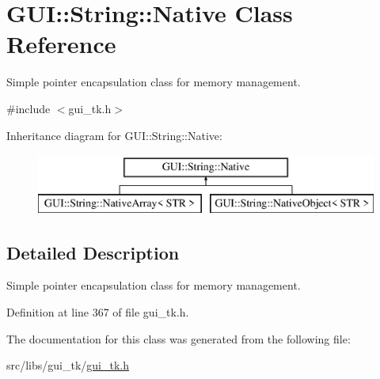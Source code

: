 \hypertarget{classGUI_1_1String_1_1Native}{\section{G\-U\-I\-:\-:String\-:\-:Native Class Reference}
\label{classGUI_1_1String_1_1Native}
}


Simple pointer encapsulation class for memory management.  




{\ttfamily \#include $<$gui\-\_\-tk.\-h$>$}

Inheritance diagram for G\-U\-I\-:\-:String\-:\-:Native\-:\begin{figure}[H]
\begin{center}
\leavevmode
\includegraphics[height=2.000000cm]{classGUI_1_1String_1_1Native}
\end{center}
\end{figure}


\subsection{Detailed Description}
Simple pointer encapsulation class for memory management. 

Definition at line 367 of file gui\-\_\-tk.\-h.



The documentation for this class was generated from the following file\-:\begin{DoxyCompactItemize}
\item 
src/libs/gui\-\_\-tk/\hyperlink{gui__tk_8h}{gui\-\_\-tk.\-h}\end{DoxyCompactItemize}
